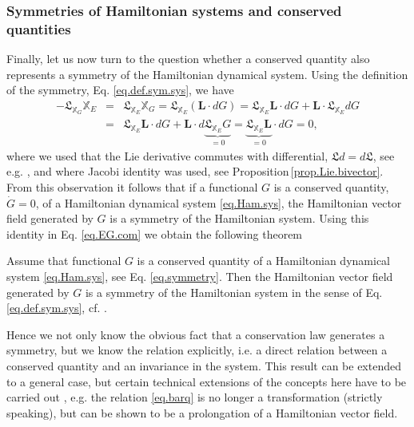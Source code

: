 \documentclass[
10pt, %
a4paper, %
oneside, %
headinclude,footinclude, %
BCOR5mm, %
]{scrartcl}
\newcommand{\XXXX}{\boldsymbol{\mathbb{X}}}
\newcommand{\LL}{\mathbf{L}}
\newcommand{\Lie}{\mathfrak{L}}
\newcommand{\Gfunc}{G}
\begin{document}
\subsubsection{Symmetries of Hamiltonian systems and conserved quantities}\label{sec.conserved}
Finally, let us now turn to the question whether a conserved quantity also represents a symmetry of the Hamiltonian dynamical system. Using the definition of the symmetry, Eq. \eqref{eq.def.sym.sys}, we have
\begin{eqnarray}\label{eq.EG.com}
- \Lie_{\XXXX_\Gfunc} \XXXX_E &=& \Lie_{\XXXX_E}\XXXX_\Gfunc = \Lie_{\XXXX_E} (\LL\cdot 
d\Gfunc) = 
\Lie_{\XXXX_E}\LL \cdot d\Gfunc +\LL\cdot\Lie_{\XXXX_E} d\Gfunc\nonumber\\
	&=& \Lie_{\XXXX_E} \LL  \cdot d\Gfunc + \LL \cdot d \underbrace{\Lie_{\XXXX_E} 
	\Gfunc}_{=0} = \underbrace{\Lie_{\XXXX_E} \LL}_{=0}  \cdot d\Gfunc=0,
\end{eqnarray}
where we used that the Lie derivative commutes with differential, $\Lie d = d 
\Lie$, see e.g. \cite{Fecko}, and where Jacobi identity was used, see 
Proposition\,\ref{prop.Lie.bivector}. From this observation it follows that if 
a functional 
$\Gfunc$ 
is a conserved quantity, $\dot{\Gfunc}=0$, of a Hamiltonian dynamical system 
\eqref{eq.Ham.sys}, the Hamiltonian vector field generated by $\Gfunc$ is a 
symmetry 
of the Hamiltonian system. Using this identity in Eq. \eqref{eq.EG.com} we 
obtain the following theorem
\begin{theorem}\label{theorem.cons.sym}
Assume that functional $\Gfunc$ is a conserved quantity of a Hamiltonian 
dynamical system \eqref{eq.Ham.sys}, see Eq. \eqref{eq.symmetry}. Then the 
Hamiltonian vector field generated by $\Gfunc$ is a symmetry of the Hamiltonian 
system in the sense of Eq. \eqref{eq.def.sym.sys}, cf. \cite{olver2000applications}.
\end{theorem}

Hence we not only know the obvious fact that a conservation law generates a 
symmetry, but we know the relation explicitly, i.e. a direct relation between a 
conserved quantity and an invariance in the system. This result can be extended 
to a general case, but certain technical extensions of the concepts here have 
to be carried out \cite{olver2000applications}, e.g. the relation 
\eqref{eq.barq} is no longer a transformation (strictly speaking), but can be 
shown to be a prolongation of a Hamiltonian vector field.

\end{document}
